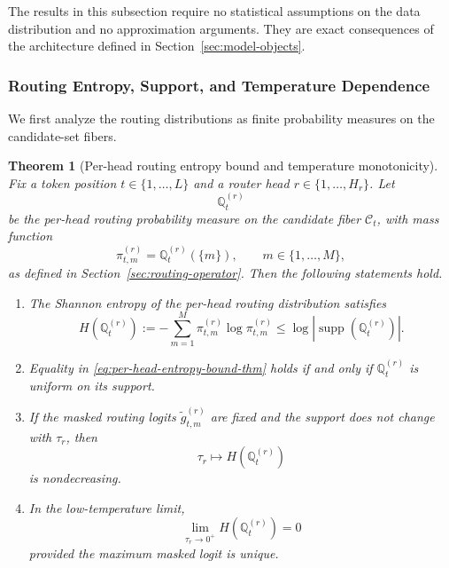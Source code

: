 \documentclass{article}
\theoremstyle{plain}
\newtheorem{theorem}{Theorem}[section]
\theoremstyle{definition}
\theoremstyle{remark}
\begin{document}
The results in this subsection require no statistical assumptions on the data distribution and no approximation arguments. They are exact consequences of the architecture defined in Section~\ref{sec:model-objects}.

\subsubsection{Routing Entropy, Support, and Temperature Dependence}
\label{sec:tier-a-routing-entropy}

We first analyze the routing distributions as finite probability measures on the candidate-set fibers.

\begin{theorem}[Per-head routing entropy bound and temperature monotonicity]
\label{thm:per-head-entropy}
Fix a token position $t \in \{1,\dots,L\}$ and a router head $r \in \{1,\dots,H_r\}$. Let
\[
\mathbb{Q}^{(r)}_{t}
\]
be the per-head routing probability measure on the candidate fiber $\mathcal{C}_{t}$, with mass function
\[
\pi^{(r)}_{t,m} = \mathbb{Q}^{(r)}_{t}(\{m\}), \qquad m \in \{1,\dots,M\},
\]
as defined in Section~\ref{sec:routing-operator}. Then the following statements hold.

\begin{enumerate}
    \item The Shannon entropy of the per-head routing distribution satisfies
    \begin{equation}
    \label{eq:per-head-entropy-bound-thm}
    H\!\left(\mathbb{Q}^{(r)}_{t}\right)
    :=
    - \sum_{m=1}^{M} \pi^{(r)}_{t,m}\log \pi^{(r)}_{t,m}
    \leq
    \log \left| \operatorname{supp}\!\left(\mathbb{Q}^{(r)}_{t}\right)\right|.
    \end{equation}

    \item Equality in \eqref{eq:per-head-entropy-bound-thm} holds if and only if $\mathbb{Q}^{(r)}_{t}$ is uniform on its support.

    \item If the masked routing logits $\tilde g^{(r)}_{t,m}$ are fixed and the support does not change with $\tau_r$, then
    \begin{equation}
    \label{eq:entropy-monotone-temp}
    \tau_r \longmapsto H\!\left(\mathbb{Q}^{(r)}_{t}\right)
    \end{equation}
    is nondecreasing.

    \item In the low-temperature limit,
    \begin{equation}
    \label{eq:entropy-low-temp-limit}
    \lim_{\tau_r \to 0^+} H\!\left(\mathbb{Q}^{(r)}_{t}\right)=0
    \end{equation}
    provided the maximum masked logit is unique.


\end{enumerate}
\end{theorem}
\end{document}

